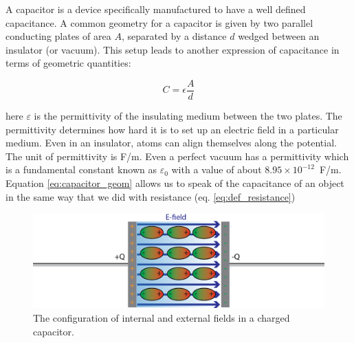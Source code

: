 \documentclass{tufte-book}
\begin{document}
A capacitor is a device specifically manufactured to have a well defined capacitance. A common geometry for a capacitor is given by two parallel conducting plates of area $A$, separated by a distance $d$ wedged between an insulator (or vacuum). This setup leads to another expression of capacitance in terms of geometric quantities:

\begin{equation}\label{eq:capacitor_geom}
C = \epsilon\frac{A}{d}
\end{equation}

\noindent here $\varepsilon$ is the permittivity of the insulating medium between the two plates. The permittivity determines how hard it is to set up an electric field in a particular medium. Even in an insulator, atoms can align themselves along the potential. The unit of permittivity is F/m. Even a perfect vacuum has a permittivity which is a fundamental constant known as $\varepsilon_0$ with a value of about $8.95\times10^{-12}$~F/m. Equation \ref{eq:capacitor_geom} allows us to speak of the capacitance of an object in the same way that we did with resistance (eq. \ref{eq:def_resistance})

\begin{figure}[h]
\caption{The configuration of internal and external fields in a charged capacitor.}
\label{fig:capcartoon}
\begin{center}
\includegraphics[width=\textwidth]{capcartoon.png}
\end{center}
\end{figure}
\end{document}
